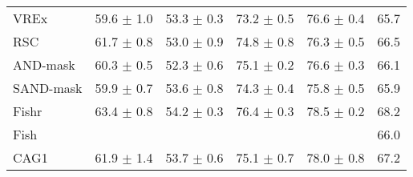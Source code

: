 \documentclass{article}
\begin{document}
\begin{center}
{\begin{tabular}{lccccc}
VREx                 & 59.6 $\pm$ 1.0       & 53.3 $\pm$ 0.3       & 73.2 $\pm$ 0.5       & 76.6 $\pm$ 0.4       & 65.7                 \\
RSC                  & 61.7 $\pm$ 0.8       & 53.0 $\pm$ 0.9       & 74.8 $\pm$ 0.8       & 76.3 $\pm$ 0.5       & 66.5                 \\
AND-mask             & 60.3 $\pm$ 0.5       & 52.3 $\pm$ 0.6       & 75.1 $\pm$ 0.2       & 76.6 $\pm$ 0.3       & 66.1                 \\
SAND-mask            & 59.9 $\pm$ 0.7       & 53.6 $\pm$ 0.8       & 74.3 $\pm$ 0.4       & 75.8 $\pm$ 0.5       & 65.9                 \\
Fishr                & 63.4 $\pm$ 0.8       & 54.2 $\pm$ 0.3       & 76.4 $\pm$ 0.3       & 78.5 $\pm$ 0.2       & 68.2                 \\
Fish                 &                      &                      &                      &                      & 66.0                \\
\midrule
CAG1                 & 61.9 $\pm$ 1.4       & 53.7 $\pm$ 0.6       & 75.1 $\pm$ 0.7       & 78.0 $\pm$ 0.8       & 67.2                 \\

\bottomrule
\end{tabular}}
\end{center}
\end{document}
